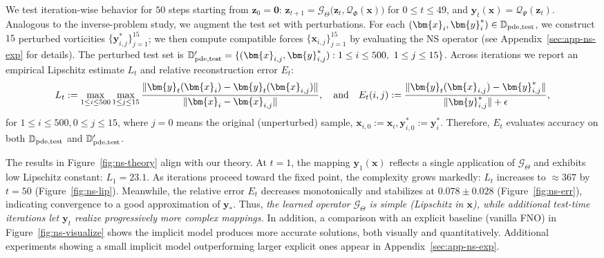 \documentclass{amsart} %
\def\vzero{{\bm{0}}}
\def\vx{{\bm{x}}}
\def\vy{{\bm{y}}}
\def\vz{{\bm{z}}}
\def\sD{{\mathbb{D}}}
\def\cG{{\mathcal{G}}}
\def\cQ{{\mathcal{Q}}}
\theoremstyle{definition}
\theoremstyle{remark}
\begin{document}
We test iteration-wise behavior for \(50\) steps starting from \(\vz_{0}=\vzero\): $\vz_{t+1}=\cG_{\Theta}\big(\vz_t,\cQ_{\Phi}(\vx)\big)$ for $0\le t\le 49$, and $\vy_t(\vx)=\cQ_{\Psi}(\vz_t)$.
Analogous to the inverse-problem study, we augment the test set with perturbations.
For each \((\vx_i,\vy_i^\ast)\in\sD_{\textup{pde,test}}\), we construct \(15\) perturbed vorticities \(\{\vy^\ast_{i,j}\}_{j=1}^{15}\); we then compute compatible forces \(\{\vx_{i,j}\}_{j=1}^{15}\) by evaluating the NS operator (see Appendix~\ref{sec:app-ns-exp} for details).
The perturbed test set is $\sD'_{\textup{pde,test}}=\{(\vx_{i,j},\vy^\ast_{i,j}) : 1\le i\le 500,\ 1\le j\le 15\}$.
Across iterations we report an empirical Lipschitz estimate $L_t$ and relative reconstruction error $E_t$:
\[L_t := \max_{1 \leq i \leq 500} \max_{1 \leq j \leq 15} \frac{\| \vy_t(\vx_{i}) - \vy_t(\vx_{i,j}) \|}{ \|\vx_{i} - \vx_{i,j}\| }, \quad \textup{and}\quad  E_t(i,j) := \frac{\|\vy_t(\vx_{i,j})-\vy^\ast_{i,j}\|}{\|\vy^\ast_{i,j}\|+\epsilon},\]
for $1 \leq i \leq 500, 0 \leq j \leq 15$,
where $j=0$ means the original (unperturbed) sample, $\vx_{i,0}:=\vx_i,\vy^\ast_{i,0}:=\vy^\ast_i$. Therefore, \(E_t\) evaluates accuracy on both \(\sD_{\textup{pde,test}}\) and \(\sD'_{\textup{pde,test}}\).





The results in Figure~\ref{fig:ns-theory} align with our theory. 
At \(t=1\), the mapping \(\vy_1(\vx)\) reflects a single application of \(\cG_{\Theta}\) and exhibits low Lipschitz constant: \(L_1=23.1\).
As iterations proceed toward the fixed point, the complexity grows markedly: \(L_t\) increases to \(\approx 367\) by \(t=50\) (Figure~\ref{fig:ns-lip}).
Meanwhile, the relative error \(E_t\) decreases monotonically and stabilizes at \(0.078 \pm 0.028\) (Figure~\ref{fig:ns-err}), indicating convergence to a good approximation of \(\vy_\ast\).
Thus, \textit{the learned operator $\cG_\Theta$ is simple (Lipschitz in $\vx$), while additional test-time iterations let $\vy_t$ realize progressively more complex mappings.}
In addition, a comparison with an explicit baseline (vanilla FNO) in Figure~\ref{fig:ns-visualize} shows the implicit model produces more accurate solutions, both visually and quantitatively. 
Additional experiments showing a small implicit model outperforming larger explicit ones appear in Appendix~\ref{sec:app-ns-exp}.
\end{document}
